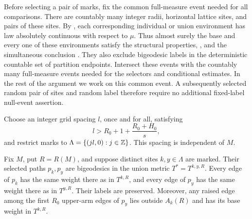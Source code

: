 Before selecting a pair of marks, fix the common full-measure event
needed for all comparisons.  There are countably many integer radii,
horizontal lattice sites, and pairs of these sites.  By
, each corresponding individual or union environment
has law absolutely continuous with respect to $\mu$.  Thus almost surely
the base and every one of these environments satisfy the structural
properties, , and the simultaneous conclusion
.  They also exclude bigeodesic labels in the
deterministic countable set of partition endpoints.  Intersect these
events with the countably many full-measure events needed for the
selectors and conditional estimates.  In the rest of the argument we
work on this common event.  A subsequently selected random pair of sites
and random label therefore require no additional fixed-label null-event
assertion.

Choose an integer grid spacing $l$, once and for all, satisfying
\begin{equation}\label{eq:fixed-grid-spacing}
 l>R_0+1+\frac{R_0+H_0}{s},
\end{equation}
and restrict marks to $\Lambda=\{(jl,0):j\in\mathbb Z\}$.  This spacing is
independent of $M$.

\begin{lemma}\label{lem:union}
Fix $M$, put $R=R(M)$, and suppose distinct sites $k,y\in\Lambda$ are
marked.  Their selected paths $p_k,p_y$ are bigeodesics in the union
metric $T^*=T^{k,y,R}$.  Every edge of $p_k$ has the same weight there
as in $T^{k,R}$, and every edge of $p_y$ has the same weight there as in
$T^{y,R}$.  Their labels are preserved.  Moreover, any raised edge among
the first $R_0$ upper-arm edges of $p_y$ lies outside $A_k(R)$ and has
its base weight in $T^{k,R}$.
\end{lemma}


